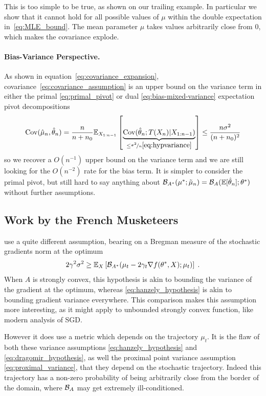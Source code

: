 \documentclass{article}
\newcommand*{\expect}[2][]{\ensuremath{\mathbb{E}_{#1} \left[ #2 \right] }} %
\newcommand{\logpart}{A}
\newcommand{\bregman}{\cB_\logpart}
\newcommand{\bregmanconj}{\cB_{\logpart^*}}
\newcommand{\natp}{\theta}
\newcommand{\lr}{\gamma} %
\newcommand{\MAPm}{\hat \mu_n}
\newcommand{\MAPt}{\hat \natp_n}
\begin{document}
This is too simple to be true, as shown on our trailing example.
In particular we show that it cannot hold for all possible values of $\mu$ within the double expectation in~\eqref{eq:MLE_bound}.
The mean parameter $\mu$ takes values arbitrarily close from $0$, which makes the covariance explode.

\paragraph{Bias-Variance Perspective.}
As shown in equation~\eqref{eq:covariance_expansion}, covariance~\eqref{eq:covariance_assumption} is an upper bound on the variance term in either the primal \eqref{eq:primal_pivot} or dual \eqref{eq:bias-mixed-variance} expectation pivot decompositions
\begin{align}
	\Cov(\MAPm, \MAPt)  = \frac{n}{n+n_0} \expect[X_{1:n-1}]{\underbrace{\Cov(\MAPt ; T(X_{n}) | X_{1:n-1} )}_{\leq \nicefrac{\sigma^2}{n} \eqref{eq:hypvariance}}}
	\leq  \frac{n \sigma^2}{(n+n_0)^2}
\end{align}
so we recover a $O(n^{-1})$ upper bound on the variance term and we are still looking for the $O(n^{-2})$ rate for the bias term. It is simpler to consider the primal pivot, but still hard to say anything about $\bregmanconj(\mu^* ; \tilde \mu_n) = \bregman(\E[\MAPt]; \natp^*)$ without further assumptions.

\subsection{Work by the French Musketeers}

\citet{dragomir2021fast} use a quite different assumption, bearing on a Bregman measure of the stochastic gradients norm at the optimum
\begin{align}
	2 \lr^2 \sigma^2
	\geq \expect[X]{\bregmanconj(\mu_t - 2 \lr_t \nabla f(\natp^*, X) ; \mu_t ) } \; .
	\label{eq:dragomir_hypothesis}
\end{align}
When $\logpart$ is strongly convex, this hypothesis is akin to bounding the variance of the gradient at the optimum, whereas \eqref{eq:hanzely_hypothesis} is akin to bounding gradient variance everywhere. This comparison makes this assumption more interesting, as it might apply to unbounded strongly convex function, like modern analysis of SGD. 

However it does use a metric which depends on the trajectory $\mu_t$. It is the flaw of both these variance assumptions \eqref{eq:hanzely_hypothesis} and \eqref{eq:dragomir_hypothesis}, as well the proximal point variance assumption \eqref{eq:proximal_variance}, that they depend on the stochastic trajectory. Indeed this trajectory has a non-zero probability of being arbitrarily close from the border of the domain, where $\bregman$ may get extremely ill-conditioned. 
\end{document}

